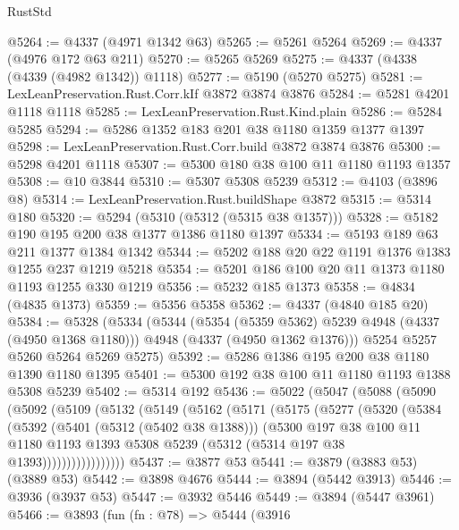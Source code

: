 \begin{lexlean}{RustStd}
\begin{coremodule}
{\begin{coremodule}
{{{{{{{{{{{{{{{{{{{{{{{{{{{{{{{{@5264 := @4337 (@4971 @1342 @63)
@5265 := @5261 @5264
@5269 := @4337 (@4976 @172 @63 @211)
@5270 := @5265 @5269
@5275 := @4337 (@4338 (@4339 (@4982 @1342)) @1118)
@5277 := @5190 (@5270 @5275)
@5281 := LexLeanPreservation.Rust.Corr.kIf @3872 @3874 @3876
@5284 := @5281 @4201 @1118 @1118
@5285 := LexLeanPreservation.Rust.Kind.plain
@5286 := @5284 @5285
@5294 := @5286 @1352 @183 @201 @38 @1180 @1359 @1377 @1397
@5298 := LexLeanPreservation.Rust.Corr.build @3872 @3874 @3876
@5300 := @5298 @4201 @1118
@5307 := @5300 @180 @38 @100 @11 @1180 @1193 @1357
@5308 := @10 @3844
@5310 := @5307 @5308 @5239
@5312 := @4103 (@3896 @8)
@5314 := LexLeanPreservation.Rust.buildShape @3872
@5315 := @5314 @180
@5320 := @5294 (@5310 (@5312 (@5315 @38 @1357)))
@5328 := @5182 @190 @195 @200 @38 @1377 @1386 @1180 @1397
@5334 := @5193 @189 @63 @211 @1377 @1384 @1342
@5344 := @5202 @188 @20 @22 @1191 @1376 @1383 @1255 @237 @1219 @5218
@5354 := @5201 @186 @100 @20 @11 @1373 @1180 @1193 @1255 @330 @1219
@5356 := @5232 @185 @1373
@5358 := @4834 (@4835 @1373)
@5359 := @5356 @5358
@5362 := @4337 (@4840 @185 @20)
@5384 := @5328
    (@5334
      (@5344
        (@5354 (@5359 @5362) @5239 @4948 (@4337 (@4950 @1368 @1180)))
        @4948
        (@4337 (@4950 @1362 @1376)))
      @5254
      @5257
      @5260
      @5264
      @5269
      @5275)
@5392 := @5286 @1386 @195 @200 @38 @1180 @1390 @1180 @1395
@5401 := @5300 @192 @38 @100 @11 @1180 @1193 @1388 @5308 @5239
@5402 := @5314 @192
@5436 := @5022
    (@5047
      (@5088
        (@5090
          (@5092
            (@5109
              (@5132
                (@5149
                  (@5162
                    (@5171
                      (@5175
                        (@5277
                          (@5320
                            (@5384
                              (@5392
                                (@5401 (@5312 (@5402 @38 @1388)))
                                (@5300
                                  @197
                                  @38
                                  @100
                                  @11
                                  @1180
                                  @1193
                                  @1393
                                  @5308
                                  @5239
                                  (@5312 (@5314 @197 @38 @1393)))))))))))))))))
@5437 := @3877 @53
@5441 := @3879 (@3883 @53) (@3889 @53)
@5442 := @3898 @4676
@5444 := @3894 (@5442 @3913)
@5446 := @3936 (@3937 @53)
@5447 := @3932 @5446
@5449 := @3894 (@5447 @3961)
@5466 := @3893
    (fun (fn : @78) =>
    @5444
      (@3916
}}}}}}}}}}}}}}}}}}}}}}}}}}}}}}}}
\end{coremodule}}
\end{coremodule}
\end{lexlean}
